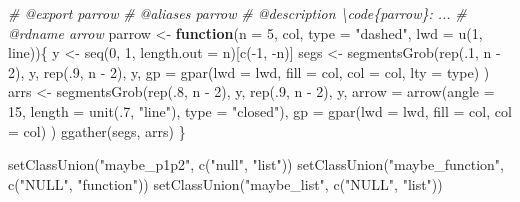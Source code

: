 \documentclass[
]{article}
\newenvironment{Shaded}{\begin{snugshade}}{\end{snugshade}}
\newcommand{\AttributeTok}[1]{\textcolor[rgb]{0.77,0.63,0.00}{#1}}
\newcommand{\CommentTok}[1]{\textcolor[rgb]{0.56,0.35,0.01}{\textit{#1}}}
\newcommand{\ControlFlowTok}[1]{\textcolor[rgb]{0.13,0.29,0.53}{\textbf{#1}}}
\newcommand{\DecValTok}[1]{\textcolor[rgb]{0.00,0.00,0.81}{#1}}
\newcommand{\FunctionTok}[1]{\textcolor[rgb]{0.00,0.00,0.00}{#1}}
\newcommand{\NormalTok}[1]{#1}
\newcommand{\OtherTok}[1]{\textcolor[rgb]{0.56,0.35,0.01}{#1}}
\newcommand{\SpecialCharTok}[1]{\textcolor[rgb]{0.00,0.00,0.00}{#1}}
\newcommand{\StringTok}[1]{\textcolor[rgb]{0.31,0.60,0.02}{#1}}
\begin{document}
\begin{Shaded}
\begin{Highlighting}[]
\CommentTok{\#\textquotesingle{} @export parrow}
\CommentTok{\#\textquotesingle{} @aliases parrow}
\CommentTok{\#\textquotesingle{} @description \textbackslash{}code\{parrow\}: ...}
\CommentTok{\#\textquotesingle{} @rdname arrow}
\NormalTok{parrow }\OtherTok{\textless{}{-}} \ControlFlowTok{function}\NormalTok{(}\AttributeTok{n =} \DecValTok{5}\NormalTok{, col, }\AttributeTok{type =} \StringTok{"dashed"}\NormalTok{, }\AttributeTok{lwd =} \FunctionTok{u}\NormalTok{(}\DecValTok{1}\NormalTok{, line))\{}
\NormalTok{  y }\OtherTok{\textless{}{-}} \FunctionTok{seq}\NormalTok{(}\DecValTok{0}\NormalTok{, }\DecValTok{1}\NormalTok{, }\AttributeTok{length.out =}\NormalTok{ n)[}\FunctionTok{c}\NormalTok{(}\SpecialCharTok{{-}}\DecValTok{1}\NormalTok{, }\SpecialCharTok{{-}}\NormalTok{n)]}
\NormalTok{  segs }\OtherTok{\textless{}{-}} \FunctionTok{segmentsGrob}\NormalTok{(}\FunctionTok{rep}\NormalTok{(.}\DecValTok{1}\NormalTok{, n }\SpecialCharTok{{-}} \DecValTok{2}\NormalTok{), y,}
    \FunctionTok{rep}\NormalTok{(.}\DecValTok{9}\NormalTok{, n }\SpecialCharTok{{-}} \DecValTok{2}\NormalTok{), y,}
    \AttributeTok{gp =} \FunctionTok{gpar}\NormalTok{(}\AttributeTok{lwd =}\NormalTok{ lwd, }\AttributeTok{fill =}\NormalTok{ col, }\AttributeTok{col =}\NormalTok{ col, }\AttributeTok{lty =}\NormalTok{ type)}
\NormalTok{  )}
\NormalTok{  arrs }\OtherTok{\textless{}{-}} \FunctionTok{segmentsGrob}\NormalTok{(}\FunctionTok{rep}\NormalTok{(.}\DecValTok{8}\NormalTok{, n }\SpecialCharTok{{-}} \DecValTok{2}\NormalTok{), y,}
    \FunctionTok{rep}\NormalTok{(.}\DecValTok{9}\NormalTok{, n }\SpecialCharTok{{-}} \DecValTok{2}\NormalTok{), y,}
    \AttributeTok{arrow =} \FunctionTok{arrow}\NormalTok{(}\AttributeTok{angle =} \DecValTok{15}\NormalTok{, }\AttributeTok{length =} \FunctionTok{unit}\NormalTok{(.}\DecValTok{7}\NormalTok{, }\StringTok{"line"}\NormalTok{), }\AttributeTok{type =} \StringTok{"closed"}\NormalTok{),}
    \AttributeTok{gp =} \FunctionTok{gpar}\NormalTok{(}\AttributeTok{lwd =}\NormalTok{ lwd, }\AttributeTok{fill =}\NormalTok{ col, }\AttributeTok{col =}\NormalTok{ col)}
\NormalTok{  )}
  \FunctionTok{ggather}\NormalTok{(segs, arrs)}
\NormalTok{\}}

\FunctionTok{setClassUnion}\NormalTok{(}\StringTok{"maybe\_p1p2"}\NormalTok{, }\FunctionTok{c}\NormalTok{(}\StringTok{"null"}\NormalTok{, }\StringTok{"list"}\NormalTok{))}
\FunctionTok{setClassUnion}\NormalTok{(}\StringTok{"maybe\_function"}\NormalTok{, }\FunctionTok{c}\NormalTok{(}\StringTok{"NULL"}\NormalTok{, }\StringTok{"function"}\NormalTok{))}
\FunctionTok{setClassUnion}\NormalTok{(}\StringTok{"maybe\_list"}\NormalTok{, }\FunctionTok{c}\NormalTok{(}\StringTok{"NULL"}\NormalTok{, }\StringTok{"list"}\NormalTok{))}


\end{Highlighting}
\end{Shaded}
\end{document}
